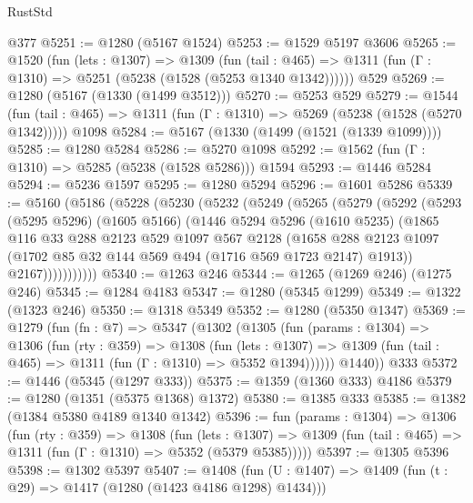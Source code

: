 \begin{lexlean}{RustStd}
\begin{coremodule}
    @377
@5251 := @1280 (@5167 @1524)
@5253 := @1529 @5197 @3606
@5265 := @1520
    (fun (lets : @1307) =>
    @1309
      (fun (tail : @465) => @1311 (fun (Γ : @1310) => @5251 (@5238 (@1528 (@5253 @1340 @1342))))))
    @529
@5269 := @1280 (@5167 (@1330 (@1499 @3512)))
@5270 := @5253 @529
@5279 := @1544
    (fun (tail : @465) => @1311 (fun (Γ : @1310) => @5269 (@5238 (@1528 (@5270 @1342)))))
    @1098
@5284 := @5167 (@1330 (@1499 (@1521 (@1339 @1099))))
@5285 := @1280 @5284
@5286 := @5270 @1098
@5292 := @1562 (fun (Γ : @1310) => @5285 (@5238 (@1528 @5286))) @1594
@5293 := @1446 @5284
@5294 := @5236 @1597
@5295 := @1280 @5294
@5296 := @1601 @5286
@5339 := @5160
    (@5186
      (@5228
        (@5230
          (@5232
            (@5249
              (@5265
                (@5279
                  (@5292
                    (@5293
                      (@5295 @5296)
                      (@1605 @5166)
                      (@1446
                        @5294
                        @5296
                        (@1610 @5235)
                        (@1865
                          @116
                          @33
                          @288
                          @2123
                          @529
                          @1097
                          @567
                          @2128
                          (@1658
                            @288
                            @2123
                            @1097
                            (@1702 @85 @32 @144 @569 @494 (@1716 @569 @1723 @2147) @1913))
                          @2167)))))))))))
@5340 := @1263 @246
@5344 := @1265 (@1269 @246) (@1275 @246)
@5345 := @1284 @4183
@5347 := @1280 (@5345 @1299)
@5349 := @1322 (@1323 @246)
@5350 := @1318 @5349
@5352 := @1280 (@5350 @1347)
@5369 := @1279
    (fun (fn : @7) =>
    @5347
      (@1302
        (@1305
          (fun (params : @1304) =>
          @1306
            (fun (rty : @359) =>
            @1308
              (fun (lets : @1307) =>
              @1309 (fun (tail : @465) => @1311 (fun (Γ : @1310) => @5352 @1394))))))
        @1440))
    @333
@5372 := @1446 (@5345 (@1297 @333))
@5375 := @1359 (@1360 @333) @4186
@5379 := @1280 (@1351 (@5375 @1368) @1372)
@5380 := @1385 @333
@5385 := @1382 (@1384 @5380 @4189 @1340 @1342)
@5396 := fun (params : @1304) =>
  @1306
    (fun (rty : @359) =>
    @1308
      (fun (lets : @1307) =>
      @1309 (fun (tail : @465) => @1311 (fun (Γ : @1310) => @5352 (@5379 @5385)))))
@5397 := @1305 @5396
@5398 := @1302 @5397
@5407 := @1408 (fun (U : @1407) => @1409 (fun (t : @29) => @1417 (@1280 (@1423 @4186 @1298) @1434)))

\end{coremodule}
\end{lexlean}

